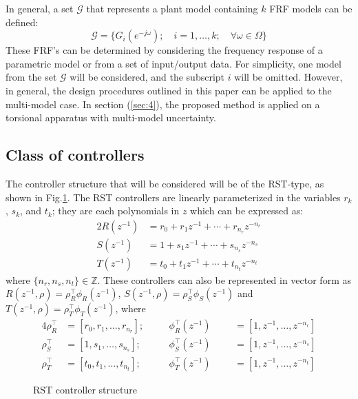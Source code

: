 \documentclass[a4paper, 10pt, conference]{ieeeconf}
\begin{document}
In general, a set $\mathcal{G}$ that represents a plant model containing $k$ FRF models can be defined:
\begin{equation}
\mathcal{G} = \{G_i(e^{-j\omega}); \quad i=1,\ldots,k; \quad \forall \omega \in \Omega\}
\end{equation} 
These FRF's can be determined by considering the frequency response of a parametric model or from a set of input/output data. For simplicity, one model from the set $\mathcal{G}$ will be considered, and the subscript $i$ will be omitted. However, in general, the design procedures outlined in this paper can be applied to the multi-model case. In section (\ref{sec:4}), the proposed method is applied on a torsional apparatus with multi-model uncertainty. 

\subsection{Class of controllers}
The controller structure that will be considered will be of the RST-type, as shown in Fig.\ref{fig:rst}. The RST controllers are linearly parameterized in the variables $r_k$, $s_k$, and $t_k$; they are each polynomials in $z$ which can be expressed as:
\begin{alignat}{2}
R(z^{-1}) &= r_0 + r_1z^{-1} + \cdots + r_{n_r}z^{-n_r} \label{eq:Rc}\\
S(z^{-1}) &= 1 + s_1z^{-1} + \cdots + s_{n_s}z^{-n_s} \label{eq:Sc}\\
T(z^{-1}) &= t_0 + t_1z^{-1} + \cdots + t_{n_t}z^{-n_t} \label{eq:Tc}
\end{alignat}
where $\{n_r,n_s,n_t\} \in \mathbb{Z}$. These controllers can also be represented in vector form as $R(z^{-1},\rho)=\rho_R^\top \phi_R(z^{-1})$, $S(z^{-1},\rho)=\rho_S^\top \phi_S(z^{-1})$ and $T(z^{-1},\rho)=\rho_T^\top \phi_T(z^{-1})$, where 
\begin{alignat}{4}
\rho_R^\top &= [r_0,r_1,\ldots,r_{n_r}]; &&\quad \phi_R^\top(z^{-1}) &&&= [1,z^{-1},\ldots,z^{-n_r}]\\
\rho_S^\top &= [1,s_1,\ldots,s_{n_s}]; &&\quad \phi_S^\top(z^{-1}) &&&= [1,z^{-1},\ldots,z^{-n_s}]\\
\rho_T^\top &= [t_0,t_1,\ldots,t_{n_t}];  &&\quad \phi_T^\top(z^{-1}) &&&= [1,z^{-1},\ldots,z^{-n_t}]
\end{alignat}
\begin{figure}
\centering
\resizebox{1.0\columnwidth}{!}{}
\caption{RST controller structure}
\label{fig:rst}
\end{figure}
\end{document}
